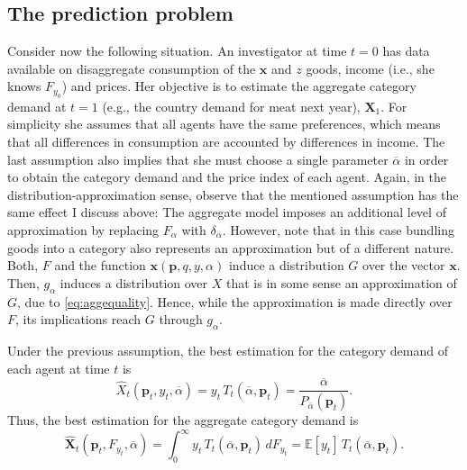 \documentclass[english, a4paper, 12pt]{article}
\begin{document}
\subsection{The prediction problem}
Consider now the following situation. An investigator at time $t = 0$ has data available on disaggregate consumption of the $\mathbf{x}$ and $z$ goods, income (i.e., she knows $F_{y_{0}}$) and prices. Her objective is to estimate the aggregate category demand at $t=1$ (e.g., the country demand for meat next year), $\mathbf{X}_{1}$. For simplicity she assumes that all agents have the same preferences, which means that all differences in consumption are accounted by differences in income. The last assumption also implies that she must choose a single parameter $\overline{\alpha}$ in order to obtain the category demand and the price index of each agent. Again, in the distribution-approximation sense, observe that the mentioned assumption has the same effect I discuss above: The aggregate model imposes an additional level of approximation by replacing  $F_{\alpha}$ with $\delta_{\overline{\alpha}}$. However, note that in this case bundling goods into a category also represents an approximation but of a different nature. Both, $F$ and the function $\mathbf{x}(\mathbf{p}, q, y, \alpha)$ induce a distribution $G$ over the vector $\mathbf{x}$. Then, $g_{\alpha}$ induces a distribution over $X$ that is in some sense an approximation of $G$, due to \eqref{eq:aggequality}. Hence, while the approximation is made directly over $F$, its implications reach $G$ through $g_{\alpha}$.

Under the previous assumption, the best estimation for the category demand of each agent at time $t$ is
	$$\widehat{X}_{t}(\mathbf{p}_{t}, y_{t}, \overline{\alpha}) = y_{t}\, T_{t}(\overline{\alpha}, \mathbf{p}_{t}) = \frac{\overline{\alpha}}{P_{\overline{\alpha}}(\mathbf{p}_{t})}.$$
Thus, the best estimation for the aggregate category demand is
	\begin{equation} \label{eq:AggCatDemand}
		\widehat{\mathbf{X}}_{t}(\mathbf{p}_{t}, F_{y_{t}}, \overline{\alpha}) 
			= \int_{0}^{\infty}y_{t}\, T_{t}(\overline{\alpha}, \mathbf{p}_{t}) \, dF_{y_{t}}
			= \mathbb{E}[y_{t}]\, T_{t}(\overline{\alpha}, \mathbf{p}_{t}).
	\end{equation}

\end{document}
